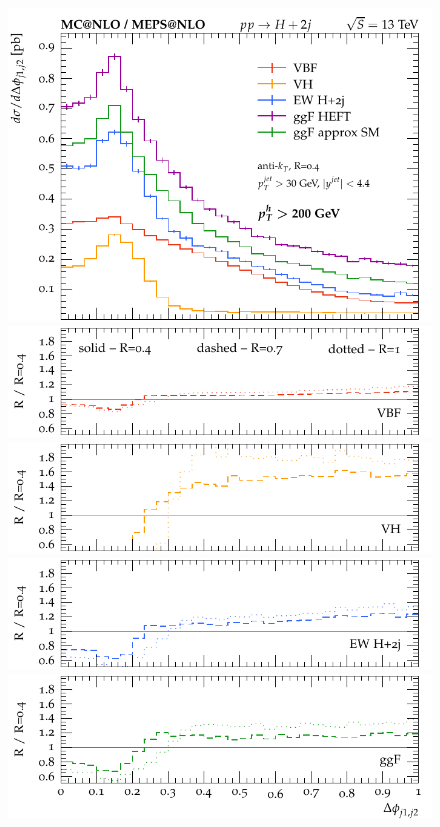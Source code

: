 \documentclass[10pt,prd,fleqn,superscriptaddress,notitlepage,nofootinbib,preprintnumbers,nobalancelastpage]{revtex4-1}
\begin{document}
\begin{figure}[p]
\begin{minipage}{.28\textwidth}
  \end{minipage}\hfill
  \begin{minipage}{.28\textwidth}
    \includegraphics[width=\textwidth]{figures/channels/delta_phi_jj12_pth200.pdf}
    \includegraphics[width=\textwidth]{figures/channels/delta_phi_jj12_pth200_rVBF.pdf}
    \includegraphics[width=\textwidth]{figures/channels/delta_phi_jj12_pth200_rVH.pdf}
    \includegraphics[width=\textwidth]{figures/channels/delta_phi_jj12_pth200_rHJJ.pdf}
    \includegraphics[width=\textwidth]{figures/channels/delta_phi_jj12_pth200_rGGH.pdf}

\end{minipage}
\end{figure}
\end{document}
